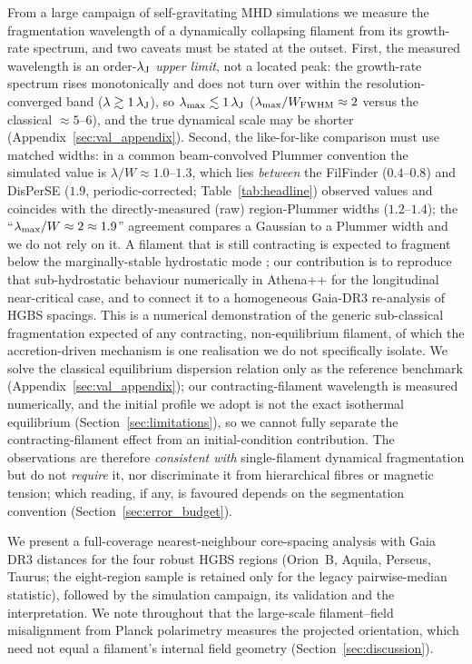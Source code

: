 \documentclass[usenatbib,twoside,twocolumn]{mnras}
\begin{document}
From a large campaign of self-gravitating MHD simulations we measure the fragmentation wavelength of a dynamically collapsing filament from its growth-rate spectrum, and two caveats must be stated at the outset. First, the measured wavelength is an order-$\lambda_{\rm J}$ \emph{upper limit}, not a located peak: the growth-rate spectrum rises monotonically and does not turn over within the resolution-converged band ($\lambda\gtrsim1\,\lambda_{\rm J}$), so $\lambda_{\rm max}\lesssim1\,\lambda_{\rm J}$ ($\lambda_{\rm max}/W_{\rm FWHM}\approx2$ versus the classical $\approx5$--$6$), and the true dynamical scale may be shorter (Appendix~\ref{sec:val_appendix}). Second, the like-for-like comparison must use matched widths: in a common beam-convolved Plummer convention the simulated value is $\lambda/W\approx1.0$--$1.3$, which lies \emph{between} the FilFinder ($0.4$--$0.8$) and DisPerSE ($1.9$, periodic-corrected; Table~\ref{tab:headline}) observed values and coincides with the directly-measured (raw) region-Plummer widths ($1.2$--$1.4$); the ``$\lambda_{\rm max}/W\approx2\approx1.9$'' agreement compares a Gaussian to a Plummer width and we do not rely on it. A filament that is still contracting is expected to fragment below the marginally-stable hydrostatic mode \citep{Clarke2016,Clarke2017}; our contribution is to reproduce that sub-hydrostatic behaviour numerically in Athena++ for the longitudinal near-critical case, and to connect it to a homogeneous Gaia-DR3 re-analysis of HGBS spacings. This is a numerical demonstration of the generic sub-classical fragmentation expected of any contracting, non-equilibrium filament, of which the accretion-driven \citet{Clarke2016,Clarke2017} mechanism is one realisation we do not specifically isolate. We solve the classical equilibrium dispersion relation only as the reference benchmark (Appendix~\ref{sec:val_appendix}); our contracting-filament wavelength is measured numerically, and the initial profile we adopt is not the exact isothermal equilibrium (Section~\ref{sec:limitations}), so we cannot fully separate the contracting-filament effect from an initial-condition contribution. The observations are therefore \emph{consistent with} single-filament dynamical fragmentation but do not \emph{require} it, nor discriminate it from hierarchical fibres or magnetic tension; which reading, if any, is favoured depends on the segmentation convention (Section~\ref{sec:error_budget}).

We present a full-coverage nearest-neighbour core-spacing analysis with Gaia DR3 distances \citep{Zhang2023} for the four robust HGBS regions (Orion~B, Aquila, Perseus, Taurus; the eight-region sample is retained only for the legacy pairwise-median statistic), followed by the simulation campaign, its validation and the interpretation. We note throughout that the large-scale filament--field misalignment from Planck polarimetry \citep{Planck2016} measures the projected orientation, which need not equal a filament's internal field geometry (Section~\ref{sec:discussion}).
\end{document}
